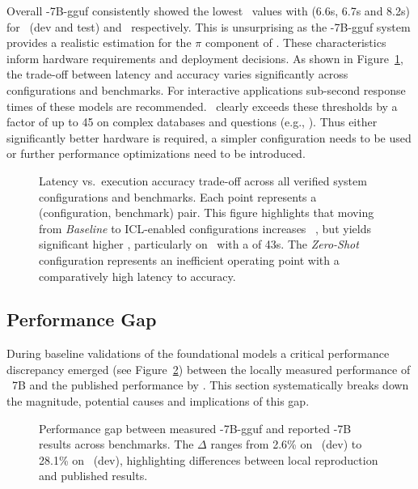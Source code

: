 Overall \OmniSQL-7B-gguf consistently showed the lowest \CL~values with
(6.6s, 6.7s and 8.2s) for \Spider~(dev and test) and \Bird~respectively. This is
unsurprising as the \OmniSQL-7B-gguf system provides a realistic estimation
for the $\pi$ component of \Natural. These characteristics inform hardware
requirements and deployment decisions. As shown in
Figure~\ref{fig:eval:latency-accuracy-tradeoff}, the trade-off between latency
and accuracy varies significantly across configurations and benchmarks. For interactive applications
sub-second response times of these models are recommended. \Natural~clearly
exceeds these thresholds by a factor of up to 45 on complex databases and
questions (e.g., \Bird). Thus either significantly better hardware is
required, a simpler configuration needs to be used or further performance
optimizations need to be introduced.

\begin{figure}[htbp]
  \centering
  
  \caption{
    Latency vs.\ execution accuracy trade-off across all verified system
    configurations and benchmarks. Each point represents a
    (configuration, benchmark) pair. This figure highlights that moving from
    \textit{Baseline} to ICL-enabled configurations increases \EA~, but yields
    significant higher \CL, particularly on \Bird~with a \CL of 43s. The
    \textit{Zero-Shot} configuration represents an inefficient operating point
    with a comparatively high latency to accuracy.
  }
  \label{fig:eval:latency-accuracy-tradeoff}
\end{figure}

\subsection{Performance Gap}\label{sec:eval:performance-gap}

During baseline validations of the foundational models a critical performance
discrepancy emerged (see Figure~\ref{fig:eval:omnisql-gap}) between the locally
measured performance of \OmniSQL~7B and the published performance by
\citeauthor{OmniSQL}. This section systematically breaks down the magnitude,
potential causes and implications of this gap. 

\begin{figure}[htbp]
  \centering
  
  \caption{
    Performance gap between measured \OmniSQL-7B-gguf and reported
    \OmniSQL-7B results across benchmarks. The $\Delta$ ranges from 2.6\% on
    \Spider~(dev) to 28.1\% on \Bird~(dev), highlighting differences between
    local reproduction and published results.
  }
  \label{fig:eval:omnisql-gap}
\end{figure}

